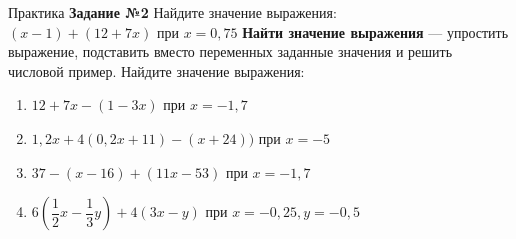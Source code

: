 \documentclass[12pt, aspectratio=169]{beamer}
\begin{document}
\begin{frame}{Практика}
	\onslide<1->
	\textbf{Задание №2} Найдите значение выражения:\\
	$(x-1)+(12+7x)$ при $x=0,75$
	\onslide<2->
	\textbf{Найти значение выражения} — упростить выражение, подставить вместо переменных заданные значения и решить числовой пример.
	\onslide<3->
	Найдите значение выражения:
	\begin{multicols}{2}
		\begin{enumerate}
			\item $12+7x-(1-3x)$ при $x=-1,7$
			\item $1,2x+4(0,2x+11)-(x+24))$ при $x=-5$
			\item $37-(x-16)+(11x-53)$ при $x=-1,7$
			\item $6(\dfrac{1}{2}x-\dfrac{1}{3}y)+4(3x-y)$ при $x=-0,25, y=-0,5$
		\end{enumerate}
	\end{multicols}
\end{frame}
\end{document}
